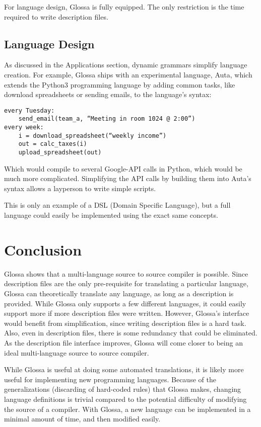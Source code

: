 \documentclass{article}
\begin{document}
For language design, Glossa is fully equipped. The only restriction is the time required to write description files.

\subsection{Language Design}

As discussed in the Applications section, dynamic grammars simplify language creation.
For example, Glossa ships with an experimental language, Auta, which extends the Python3 programming language by adding common tasks, like download spreadsheets or sending emails, to the language's syntax:

\lstset{language=Python}
\begin{lstlisting}
every Tuesday:
    send_email(team_a, “Meeting in room 1024 @ 2:00”)
every week:
    i = download_spreadsheet(“weekly income”)
    out = calc_taxes(i)
    upload_spreadsheet(out)
\end{lstlisting}
Which would compile to several Google-API calls in Python, which would be much more complicated. 
Simplifying the API calls by building them into Auta's syntax allows a layperson to write simple scripts.

This is only an example of a DSL (Domain Specific Language), but a full language could easily be implemented using the exact same concepts.

\section{Conclusion}

Glossa shows that a multi-language source to source compiler is possible. 
Since description files are the only pre-requisite for translating a particular language, Glossa can theoretically translate any language, as long as a description is provided.
While Glossa only supports a few different languages, it could easily support more if more description files were written.
However, Glossa's interface would benefit from simplification, since writing description files is a hard task. 
Also, even in description files, there is some redundancy that could be eliminated.
As the description file interface improves, Glossa will come closer to being an ideal multi-language source to source compiler.

While Glossa is useful at doing some automated translations, it is likely more useful for implementing new programming languages.
Because of the generalizations (discarding of hard-coded rules) that Glossa makes, changing language definitions is trivial compared to the potential difficulty of modifying the source of a compiler.
With Glossa, a new language can be implemented in a minimal amount of time, and then modified easily.
\end{document}
